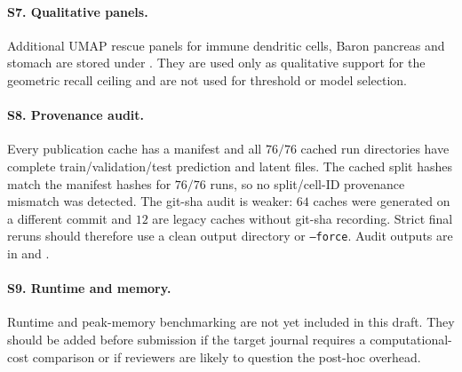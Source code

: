 \paragraph{S7. Qualitative panels.} Additional UMAP rescue panels for immune dendritic cells, Baron pancreas and
stomach are stored under . They are used only as qualitative support for the geometric recall
ceiling and are not used for threshold or model selection.

\paragraph{S8. Provenance audit.} Every publication cache has a manifest and all $76/76$ cached run directories have
complete train/validation/test prediction and latent files. The cached split hashes match the manifest hashes for
$76/76$ runs, so no split/cell-ID provenance mismatch was detected. The git-sha audit is weaker: $64$ caches were
generated on a different commit and $12$ are legacy caches without git-sha recording. Strict final reruns should
therefore use a clean output directory or \texttt{--force}. Audit outputs are in
 and .

\paragraph{S9. Runtime and memory.} Runtime and peak-memory benchmarking are not yet included in this draft. They
should be added before submission if the target journal requires a computational-cost comparison or if reviewers are
likely to question the post-hoc overhead.
